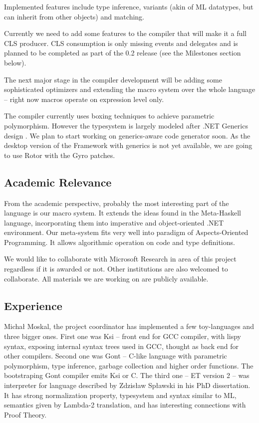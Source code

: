 \documentclass[a4paper,11pt]{article}
\begin{document}
Implemented features include type inference, variants (akin of ML
datatypes, but can inherit from other objects) and matching.

Currently we need to add some features to the compiler that will make
it a full CLS producer. CLS consumption is only missing events and
delegates and is planned to be completed as part of the 0.2 release
(see the Milestones section below).

The next major stage in the compiler development will be adding some
sophisticated optimizers and extending the macro system over the whole
language -- right now macros operate on expression level only.

The compiler currently uses boxing techniques to achieve parametric
polymorphism.  However the typesystem is largely modeled after .NET
Generics design \cite{generics}. We plan to start working on 
generics-aware code generator soon. As the desktop version of 
the Framework with generics is not yet available, we are going
to use Rotor with the Gyro patches.


\subsection{Academic Relevance}

From the academic perspective, probably the most interesting part of
the language is our macro system. It extends the ideas found in the
Meta-Haskell \cite{MetaHaskell} language, incorporating them into
imperative and object-oriented .NET environment. Our meta-system fits
very well into paradigm of Aspects-Oriented Programming. It allows
algorithmic operation on code and type definitions.

We would like to collaborate with Microsoft Research in area of this
project regardless if it is awarded or not. Other institutions are also
welcomed to collaborate. All materials we are working on are publicly
available.



\subsection{Experience}

Micha{\l} Moskal, the project coordinator has implemented a few
toy-languages and three bigger ones. First one was Ksi -- front end for
GCC compiler, with lispy syntax, exposing internal syntax trees used in
GCC, thought as back end for other compilers.  Second one was Gont --
C-like language with parametric polymorphism, type inference, garbage
collection and higher order functions. The bootstraping Gont compiler
emits Ksi or C. The third one -- ET version 2 -- was interpreter for
language described by Zdzis{\l}aw Sp{\l}awski in his PhD dissertation.
It has strong normalization property, typesystem and syntax similar to ML,
semantics given by Lambda-2 translation, and has interesting connections
with Proof Theory.
\end{document}
